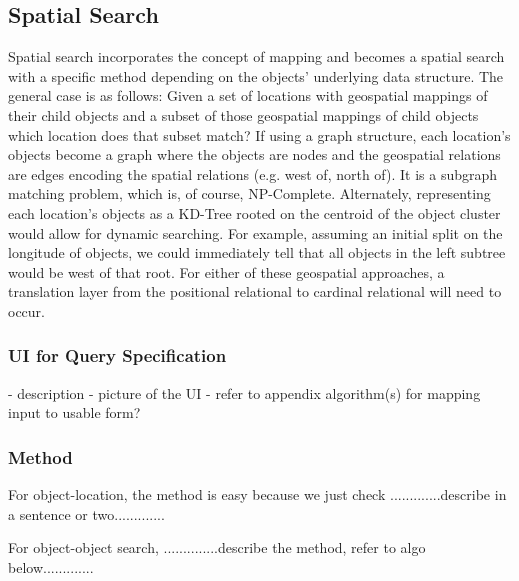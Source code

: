 \subsection{Spatial Search}
Spatial search incorporates the concept of mapping and becomes a spatial search with a specific method depending on the objects' underlying data structure. 
The general case is as follows: Given a set of locations with geospatial mappings of their child objects and a subset of those geospatial mappings of child objects which location does that subset match? 
If using a graph structure, each location's objects become a graph where the objects are nodes and the geospatial relations are edges encoding the spatial relations (e.g. west of, north of). It is a subgraph matching problem, which is, of course, NP-Complete. 
Alternately, representing each location's objects as a KD-Tree rooted on the centroid of the object cluster would allow for dynamic searching. For example, assuming an initial split on the longitude of objects, we could immediately tell that all objects in the left subtree would be west of that root. 
For either of these geospatial approaches, a translation layer from the positional relational to cardinal relational will need to occur.

\subsubsection{UI for Query Specification}
- description
- picture of the UI
- refer to appendix algorithm(s) for mapping input to usable form?

\subsubsection{Method}
For object-location, the method is easy because we just check .............describe in a sentence or two.............

For object-object search, ..............describe the method, refer to algo below.............

